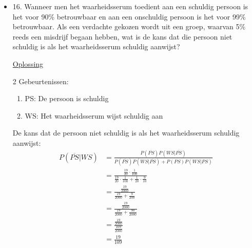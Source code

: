 \documentclass[12pt]{report}
\newcommand{\exercise}[2]{
  #1
  

  \underline{Oplossing}
  
  #2
  
    \hrulefill
}
\begin{document}
\begin{itemize}[label={}, leftmargin=*]
{{	}}
	
	\item{\exercise{16. Wanneer men het waarheidsserum toedient aan een schuldig persoon is het voor 90\% betrouwbaar en aan een onschuldig persoon is het voor 99\% betrouwbaar. Als een verdachte gekozen wordt uit een groep, waarvan 5\% reeds een misdrijf begaan hebben, wat is de kans dat die persoon niet schuldig is als het waarheidsserum schuldig aanwijst?}{
	2 Gebeurtenissen:
	\begin{enumerate}
	 \item PS: De persoon is schuldig
	 \item WS: Het waarheidsserum wijst schuldig aan
	\end{enumerate}
	De kans dat de persoon niet schuldig is als het waarheidsserum schuldig aanwijst:
	\begin{equation*}
	 \begin{split}
	 P(\overline{PS}|WS) & = \frac{P(\overline{PS})P(WS|\overline{PS})}{P(\overline{PS})P(WS|\overline{PS})+P(PS)P(WS|PS)} \\
	  & = \frac{\frac{19}{20}\cdot\frac{1}{100}}{\frac{19}{20}\cdot\frac{1}{100} + \frac{1}{20}\cdot\frac{9}{10}} \\
	  & = \frac{\frac{19}{2000}}{\frac{19}{2000} + \frac{9}{200}} \\
	  & = \frac{\frac{19}{2000}}{\frac{19}{2000} + \frac{90}{2000}} \\
	  & = \frac{\frac{19}{2000}}{\frac{109}{2000}} \\
	  & = \frac{19}{109}
	 \end{split}
	\end{equation*}

	}
	}
	       

\end{itemize}
\end{document}
